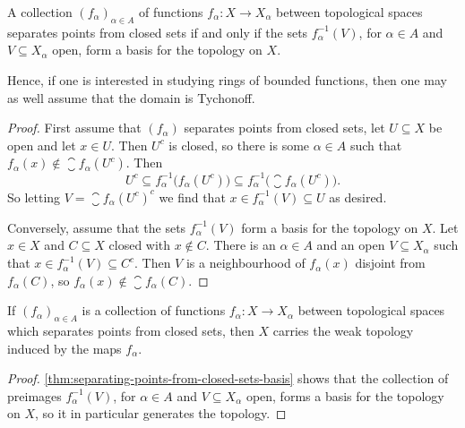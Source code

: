 \documentclass[article, a4paper, 11pt, oneside]{memoir}
\numberwithin{equation}{chapter}
\newcommand{\preim}{^{-1}}
\begin{document}
\begin{proposition}
    \label{thm:separating-points-from-closed-sets-basis}
    A collection $(f_\alpha)_{\alpha \in A}$ of functions $f_\alpha \colon X \to X_\alpha$ between topological spaces separates points from closed sets if and only if the sets $f_\alpha\preim(V)$, for $\alpha \in A$ and $V \subseteq X_\alpha$ open, form a basis for the topology on $X$.
\end{proposition}
%
Hence, if one is interested in studying rings of bounded functions, then one may as well assume that the domain is Tychonoff.

\begin{proof}
    First assume that $(f_\alpha)$ separates points from closed sets, let $U \subseteq X$ be open and let $x \in U$. Then $U^c$ is closed, so there is some $\alpha \in A$ such that $f_\alpha(x) \not\in \closure{f_\alpha(U^c)}$. Then
    \begin{equation*}
        U^c
            \subseteq f_\alpha\preim \bigl( f_\alpha(U^c) \bigr)
            \subseteq f_\alpha\preim \bigl( \closure{f_\alpha(U^c)} \bigr).
    \end{equation*}
    So letting $V = \closure{f_\alpha(U^c)}^c$ we find that $x \in f_\alpha\preim(V) \subseteq U$ as desired.

    Conversely, assume that the sets $f_\alpha\preim(V)$ form a basis for the topology on $X$. Let $x \in X$ and $C \subseteq X$ closed with $x \not\in C$. There is an $\alpha \in A$ and an open $V \subseteq X_\alpha$ such that $x \in f_\alpha\preim(V) \subseteq C^c$. Then $V$ is a neighbourhood of $f_\alpha(x)$ disjoint from $f_\alpha(C)$, so $f_\alpha(x) \not\in \closure{f_\alpha(C)}$.
\end{proof}


\begin{corollary}
    \label{thm:separating-points-from-closed-sets-weak-topology}
    If $(f_\alpha)_{\alpha \in A}$ is a collection of functions $f_\alpha \colon X \to X_\alpha$ between topological spaces which separates points from closed sets, then $X$ carries the weak topology induced by the maps $f_\alpha$.
\end{corollary}

\begin{proof}
    \cref{thm:separating-points-from-closed-sets-basis} shows that the collection of preimages $f_\alpha\preim(V)$, for $\alpha \in A$ and $V \subseteq X_\alpha$ open, forms a basis for the topology on $X$, so it in particular generates the topology.
\end{proof}
\end{document}
